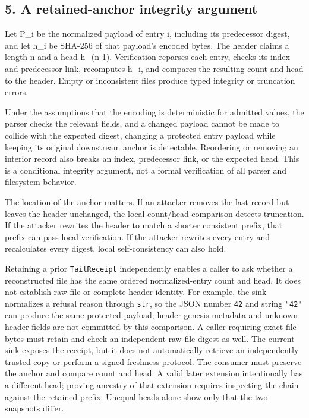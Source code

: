 \documentclass[
  11pt,
]{article}
\newcommand{\passthrough}[1]{#1}
\begin{document}
\subsection{5. A retained-anchor integrity
argument}\label{a-retained-anchor-integrity-argument}

Let P\_i be the normalized payload of entry i, including its predecessor
digest, and let h\_i be SHA-256 of that payload's encoded bytes. The
header claims a length n and a head h\_(n-1). Verification reparses each
entry, checks its index and predecessor link, recomputes h\_i, and
compares the resulting count and head to the header. Empty or
inconsistent files produce typed integrity or truncation errors.

Under the assumptions that the encoding is deterministic for admitted
values, the parser checks the relevant fields, and a changed payload
cannot be made to collide with the expected digest, changing a protected
entry payload while keeping its original downstream anchor is
detectable. Reordering or removing an interior record also breaks an
index, predecessor link, or the expected head. This is a conditional
integrity argument, not a formal verification of all parser and
filesystem behavior.

The location of the anchor matters. If an attacker removes the last
record but leaves the header unchanged, the local count/head comparison
detects truncation. If the attacker rewrites the header to match a
shorter consistent prefix, that prefix can pass local verification. If
the attacker rewrites every entry and recalculates every digest, local
self-consistency can also hold.

Retaining a prior \passthrough{\lstinline!TailReceipt!} independently
enables a caller to ask whether a reconstructed file has the same
ordered normalized-entry count and head. It does not establish raw-file
or complete header identity. For example, the sink normalizes a refusal
reason through \passthrough{\lstinline!str!}, so the JSON number
\passthrough{\lstinline!42!} and string \passthrough{\lstinline!"42"!}
can produce the same protected payload; header genesis metadata and
unknown header fields are not committed by this comparison. A caller
requiring exact file bytes must retain and check an independent raw-file
digest as well. The current sink exposes the receipt, but it does not
automatically retrieve an independently trusted copy or perform a signed
freshness protocol. The consumer must preserve the anchor and compare
count and head. A valid later extension intentionally has a different
head; proving ancestry of that extension requires inspecting the chain
against the retained prefix. Unequal heads alone show only that the two
snapshots differ.
\end{document}
